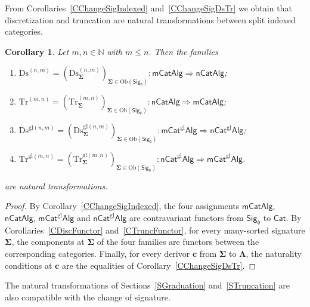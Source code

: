 \documentclass[a4paper, reqno
]{amsart}
\newcommand{\sig}[1]{\mathbf{#1}}             %
\newcommand{\gl}{\mathrm{gl}}                %
\newcommand{\Ds}{\mathrm{Ds}}
\newcommand{\Tr}{\mathrm{Tr}}
\theoremstyle{plain}
\newtheorem{corollary}[theorem]{Corollary}
\theoremstyle{definition}
\begin{document}
From Corollaries~\ref{CChangeSigIndexed} and~\ref{CChangeSigDsTr} we obtain that discretization and truncation are natural transformations between split indexed categories.

\begin{corollary}\label{CChangeSigDsTrNat}
Let $m,n\in\mathbb{N}$ with $m\leq n$.
Then the families
\begin{enumerate}
	\item 
	$\Ds^{(n,m)}=(\Ds^{(n,m)}_{\sig{\Sigma}})_{\sig{\Sigma} \in \mathrm{Ob}(\mathsf{Sig}_{\mathfrak{d}})}\colon\mathsf{mCatAlg}\Longrightarrow\mathsf{nCatAlg}$;
	
	\item
	$\Tr^{(m,n)}=(\Tr^{(m,n)}_{\sig{\Sigma}})_{\sig{\Sigma} \in \mathrm{Ob}(\mathsf{Sig}_{\mathfrak{d}})}\colon\mathsf{nCatAlg}\Longrightarrow\mathsf{mCatAlg}$;
	
	\item 
	$\Ds^{\gl(n,m)}=(\Ds^{\gl(n,m)}_{\sig{\Sigma}})_{\sig{\Sigma} \in \mathrm{Ob}(\mathsf{Sig}_{\mathfrak{d}})}\colon\mathsf{mCat}^{\gl}\mathsf{Alg}\Longrightarrow\mathsf{nCat}^{\gl}\mathsf{Alg}$;
	
	\item 
	$\Tr^{\gl(m,n)}=(\Tr^{\gl(m,n)}_{\sig{\Sigma}})_{\sig{\Sigma} \in \mathrm{Ob}(\mathsf{Sig}_{\mathfrak{d}})}\colon\mathsf{nCat}^{\gl}\mathsf{Alg}\Longrightarrow\mathsf{mCat}^{\gl}\mathsf{Alg}$.
\end{enumerate}
are natural transformations.
\end{corollary}
\begin{proof}
By Corollary~\ref{CChangeSigIndexed}, the four assignments $\mathsf{mCatAlg}$, $\mathsf{nCatAlg}$, $\mathsf{mCat}^{\gl}\mathsf{Alg}$ and $\mathsf{nCat}^{\gl}\mathsf{Alg}$ are contravariant functors from $\mathsf{Sig}_{\mathfrak{d}}$ to $\mathsf{Cat}$.
By Corollaries~\ref{CDiscFunctor} and~\ref{CTruncFunctor}, for every many-sorted signature $\sig{\Sigma}$, the components at $\sig{\Sigma}$ of the four families are functors between the corresponding categories.
Finally, for every derivor $\mathbf{c}$ from $\sig{\Sigma}$ to $\sig{\Lambda}$, the naturality conditions at $\mathbf{c}$ are the equalities of Corollary~\ref{CChangeSigDsTr}.
\end{proof}

The natural transformations of Sections~\ref{SGraduation} and~\ref{STruncation} are also compatible with the change of signature.
\end{document}

